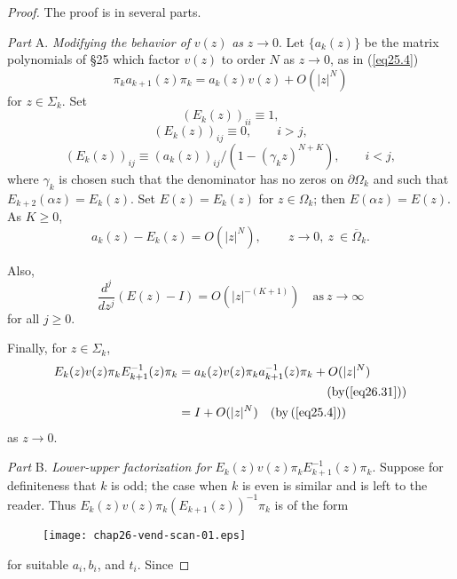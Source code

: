 \documentclass{surv-l}
\theoremstyle{plain}
\theoremstyle{definition}
\numberwithin{equation}{chapter}
\begin{document}
\begin{proof}
The proof is in several parts.

\emph{Part} A. \emph{Modifying the behavior of} $v(z)$ \emph{as} $z\rightarrow 0$. Let $\{a_{k}(z)\}$ be the matrix polynomials of \S25
which factor $v(z)$ to order $N$ as $z\rightarrow 0$, as in (\ref{eq25.4})
\begin{equation*}
\pi_{k}a_{k+1}(z)\pi_{k}=a_{k}(z)v(z)+O(|z|^{N})
\end{equation*}
for $z \in\Sigma_{k}$. Set
\begin{equation}\label{eq26.28}
(E_{k}(z))_{ii}\equiv 1,
\end{equation}
\begin{equation}\label{eq26.29}
(E_{k}(z))_{ij}\equiv 0,\qquad i>j,
\end{equation}
\begin{equation}\label{eq26.30}
(E_{k}(z))_{ij}\equiv(a_{k}(z))_{ij}/(1-(\gamma_{k}z)^{N+K}), \qquad i<j,
\end{equation}
where $\gamma_{k}$ is chosen such that the denominator has no zeros on $\partial\Omega_{k}$ and such that $E_{k+2}(\alpha z)=E_{k}(z)$. Set $E(z)=E_{k}(z)$ for $z\in\Omega_{k}$; then $E(\alpha z)=E(z)$. As $K\geq 0$,
\begin{equation}\label{eq26.31}
a_{k}(z)-E_{k}(z)=O(|z|^{N})\text{, } \qquad z\rightarrow 0,\ z\ \in\overline{\Omega}_{k}.
\end{equation}

Also,
\begin{equation}\label{eq26.32}
\frac{d^{j}}{dz^{j}}(E(z) -I)=O(|z|^{-(K+1)})\quad \mathrm{as}\  z\rightarrow\infty
\end{equation}
for all $j\geq 0$.

Finally, for $z\in\Sigma_{k}$,
\begin{align}\label{eq26.33}
E_{k}(z)v(z)\pi_{k}E_{k+1}^{-1}(z)\pi_{k}&=a_{k}(z)v(z)\pi_{k}a_{k+1}^{-1}(z)\pi_{k}+O(|z|^{N})\\ \nonumber
& \qquad \qquad\qquad \qquad\qquad \qquad (\mathrm{by} (\ref{eq26.31}))\\ \nonumber
&=I+O(|z|^{N})\quad  (\mathrm{by}\, (\ref{eq25.4})) \nonumber
\end{align}
as $z\rightarrow 0$.

\emph{Part} B. \emph{Lower-upper factorization for} $E_{k}(z)v(z)\pi_{k}E_{k+1}^{-1}(z)\pi_{k}$. Suppose for definiteness that $k$ is odd; the case when $k$ is even is similar and is left to the reader. Thus $E_{k}(z)v(z)\pi_{k}(E_{k+1}(z))^{-1}\pi_{k}$ is of the form
\begin{figure}[h]
\texttt{[image: chap26-vend-scan-01.eps]}
\end{figure}
for suitable $a_{i}, b_{i}$, and $t_{i}$. Since


\end{proof}
\end{document}
